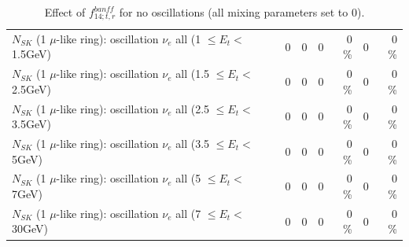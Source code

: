 \begin{table}
\begin{tabular}{| l | r | r | r  r | r  r |}
$N_{SK}$ (1 $\mu$-like ring): oscillation $\nu_{e}$ all (1 $\leq E_{t} <$ 1.5GeV) &               0 &               0 &               0 &        0 \%  &               0 &        0 \%  \\ 
$N_{SK}$ (1 $\mu$-like ring): oscillation $\nu_{e}$ all (1.5 $\leq E_{t} <$ 2.5GeV) &               0 &               0 &               0 &        0 \%  &               0 &        0 \%  \\ 
$N_{SK}$ (1 $\mu$-like ring): oscillation $\nu_{e}$ all (2.5 $\leq E_{t} <$ 3.5GeV) &               0 &               0 &               0 &        0 \%  &               0 &        0 \%  \\ 
$N_{SK}$ (1 $\mu$-like ring): oscillation $\nu_{e}$ all (3.5 $\leq E_{t} <$ 5GeV) &               0 &               0 &               0 &        0 \%  &               0 &        0 \%  \\ 
 $N_{SK}$ (1 $\mu$-like ring): oscillation $\nu_{e}$ all (5 $\leq E_{t} <$ 7GeV) &               0 &               0 &               0 &        0 \%  &               0 &        0 \%  \\ 
$N_{SK}$ (1 $\mu$-like ring): oscillation $\nu_{e}$ all (7 $\leq E_{t} <$ 30GeV) &               0 &               0 &               0 &        0 \%  &               0 &        0 \%  \\ 
\hline
\hline
\end{tabular}
\caption{ Effect of $f_{14; t, r}^{banff}$ for no oscillations (all mixing parameters set to 0). }
\label{tab:num_banff_14_1RmuT_3f_osc_t13:0}
\end{table}
\clearpage

